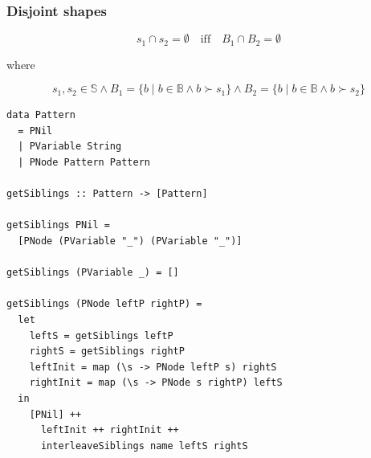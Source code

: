 \begin{frame}
\begin{columns}
\end{columns}

\end{frame}

\begin{frame}

\frametitle{Disjoint shapes}

\begin{center}

$$s_1\cap s_2=\emptyset\quad\text{iff}\quad B_1\cap B_2=\emptyset$$

where

$$s_1,s_2\in\mathbb{S} \wedge B_1=\{b\mid b\in\mathbb{B} \wedge b\succ
s_1\}\wedge B_2=\{b\mid b\in\mathbb{B} \wedge b\succ s_2\}$$

\end{center}

\end{frame}


\begin{frame}[fragile]

\begin{lstlisting}
data Pattern
  = PNil
  | PVariable String
  | PNode Pattern Pattern

getSiblings :: Pattern -> [Pattern]

getSiblings PNil =
  [PNode (PVariable "_") (PVariable "_")]

getSiblings (PVariable _) = []

getSiblings (PNode leftP rightP) =
  let
    leftS = getSiblings leftP
    rightS = getSiblings rightP
    leftInit = map (\s -> PNode leftP s) rightS
    rightInit = map (\s -> PNode s rightP) leftS
  in
    [PNil] ++
      leftInit ++ rightInit ++
      interleaveSiblings name leftS rightS
\end{lstlisting}

\end{frame}
